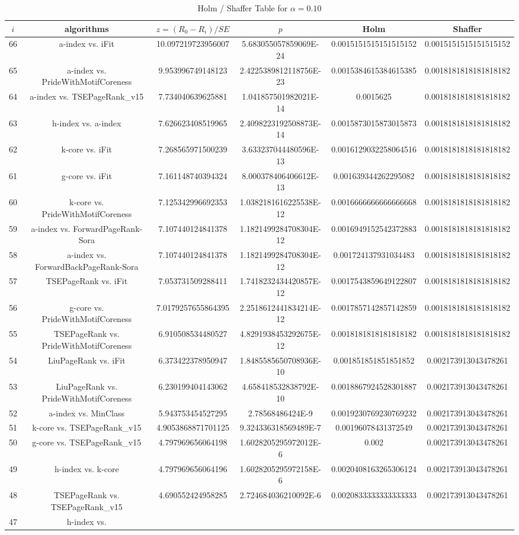\documentclass[a4paper,10pt]{article}
\begin{document}
\begin{landscape}
\begin{table}[!htp]
\centering\tiny
\caption{Holm / Shaffer Table for $\alpha=0.10$}
\begin{tabular}{cccccc}
$i$&algorithms&$z=(R_0 - R_i)/SE$&$p$&Holm&Shaffer\\
\hline
66&a-index vs. iFit&10.097219723956007&5.683055057859069E-24&0.0015151515151515152&0.0015151515151515152\\65&a-index vs. PrideWithMotifCoreness&9.953996749148123&2.4225389812118756E-23&0.0015384615384615385&0.0018181818181818182\\64&a-index vs. TSEPageRank_v15&7.734040639625881&1.041857501982021E-14&0.0015625&0.0018181818181818182\\63&h-index vs. a-index&7.626623408519965&2.4098223192508873E-14&0.0015873015873015873&0.0018181818181818182\\62&k-core vs. iFit&7.268565971500239&3.633237044480596E-13&0.0016129032258064516&0.0018181818181818182\\61&g-core vs. iFit&7.161148740394324&8.000378406406612E-13&0.001639344262295082&0.0018181818181818182\\60&k-core vs. PrideWithMotifCoreness&7.125342996692353&1.0382181616225538E-12&0.0016666666666666668&0.0018181818181818182\\59&a-index vs. ForwardPageRank-Sora&7.107440124841378&1.1821499284708304E-12&0.0016949152542372883&0.0018181818181818182\\58&a-index vs. ForwardBackPageRank-Sora&7.107440124841378&1.1821499284708304E-12&0.001724137931034483&0.0018181818181818182\\57&TSEPageRank vs. iFit&7.053731509288411&1.7418232434420857E-12&0.0017543859649122807&0.0018181818181818182\\56&g-core vs. PrideWithMotifCoreness&7.0179257655864395&2.2518612441834214E-12&0.0017857142857142859&0.0018181818181818182\\55&TSEPageRank vs. PrideWithMotifCoreness&6.910508534480527&4.8291938453292675E-12&0.0018181818181818182&0.0018181818181818182\\54&LiuPageRank vs. iFit&6.373422378950947&1.8485585650708936E-10&0.001851851851851852&0.002173913043478261\\53&LiuPageRank vs. PrideWithMotifCoreness&6.230199404143062&4.658418532838792E-10&0.0018867924528301887&0.002173913043478261\\52&a-index vs. MinClass&5.943753454527295&2.78568486424E-9&0.0019230769230769232&0.002173913043478261\\51&k-core vs. TSEPageRank_v15&4.9053868871701125&9.324336318569489E-7&0.00196078431372549&0.002173913043478261\\50&g-core vs. TSEPageRank_v15&4.797969656064198&1.6028205295972012E-6&0.002&0.002173913043478261\\49&h-index vs. k-core&4.797969656064196&1.6028205295972158E-6&0.0020408163265306124&0.002173913043478261\\48&TSEPageRank vs. TSEPageRank_v15&4.690552424958285&2.724684036210092E-6&0.0020833333333333333&0.002173913043478261\\47&h-index vs. 
\end{tabular}
\end{table}
\end{landscape}
\end{document}
